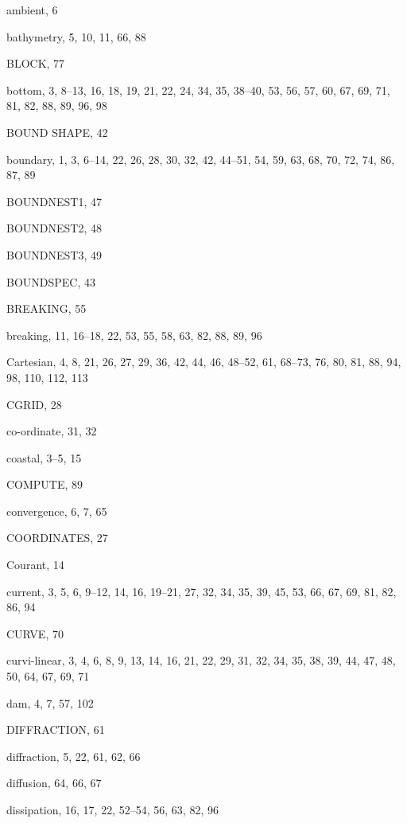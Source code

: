 \documentclass[12pt]{book}
\begin{document}
\begin{theindex}
  \item ambient, 6

  \indexspace

  \item bathymetry, 5, 10, 11, 66, 88
  \item BLOCK, 77
  \item bottom, 3, 8--13, 16, 18, 19, 21, 22, 24, 34, 35, 38--40, 53,
		56, 57, 60, 67, 69, 71, 81, 82, 88, 89, 96, 98
  \item BOUND SHAPE, 42
  \item boundary, 1, 3, 6--14, 22, 26, 28, 30, 32, 42, 44--51, 54, 59,
		63, 68, 70, 72, 74, 86, 87, 89
  \item BOUNDNEST1, 47
  \item BOUNDNEST2, 48
  \item BOUNDNEST3, 49
  \item BOUNDSPEC, 43
  \item BREAKING, 55
  \item breaking, 11, 16--18, 22, 53, 55, 58, 63, 82, 88, 89, 96

  \indexspace

  \item Cartesian, 4, 8, 21, 26, 27, 29, 36, 42, 44, 46, 48--52, 61,
		68--73, 76, 80, 81, 88, 94, 98, 110, 112, 113
  \item CGRID, 28
  \item co-ordinate, 31, 32
  \item coastal, 3--5, 15
  \item COMPUTE, 89
  \item convergence, 6, 7, 65
  \item COORDINATES, 27
  \item Courant, 14
  \item current, 3, 5, 6, 9--12, 14, 16, 19--21, 27, 32, 34, 35, 39, 45,
		53, 66, 67, 69, 81, 82, 86, 94
  \item CURVE, 70
  \item curvi-linear, 3, 4, 6, 8, 9, 13, 14, 16, 21, 22, 29, 31, 32,
		34, 35, 38, 39, 44, 47, 48, 50, 64, 67, 69, 71

  \indexspace

  \item dam, 4, 7, 57, 102
  \item DIFFRACTION, 61
  \item diffraction, 5, 22, 61, 62, 66
  \item diffusion, 64, 66, 67
  \item dissipation, 16, 17, 22, 52--54, 56, 63, 82, 96


\end{theindex}
\end{document}
